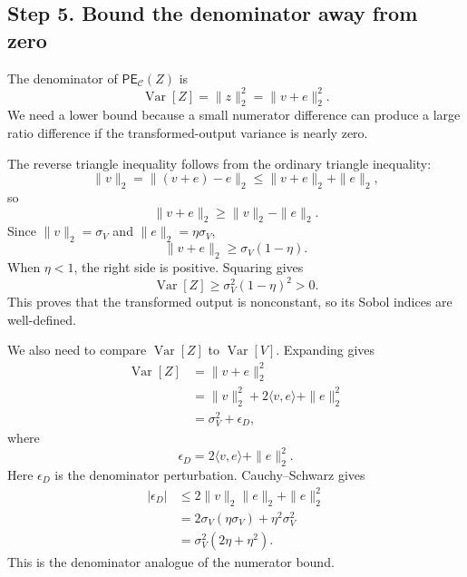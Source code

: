 \documentclass[11pt,letterpaper]{article}
\DeclareMathOperator{\Var}{Var}
\theoremstyle{remark}
\begin{document}
\subsection*{Step 5. Bound the denominator away from zero}

The denominator of $\mathsf{PE}_{\mathscr C}(Z)$ is
\begin{equation}
  \Var[Z]=\|z\|_2^2=\|v+e\|_2^2.
\end{equation}
We need a lower bound because a small numerator difference can produce a large
ratio difference if the transformed-output variance is nearly zero.

The reverse triangle inequality follows from the ordinary triangle inequality:
\begin{equation}
  \|v\|_2=\|(v+e)-e\|_2\leq\|v+e\|_2+\|e\|_2,
\end{equation}
so
\begin{equation}
  \|v+e\|_2\geq\|v\|_2-\|e\|_2.
\end{equation}
Since $\|v\|_2=\sigma_V$ and $\|e\|_2=\eta\sigma_V$,
\begin{equation}
  \|v+e\|_2\geq\sigma_V(1-\eta).
\end{equation}
When $\eta<1$, the right side is positive. Squaring gives
\begin{equation}
  \Var[Z]\geq\sigma_V^2(1-\eta)^2>0.
  \label{eq:ped_general_var_lower}
\end{equation}
This proves that the transformed output is nonconstant, so its Sobol indices are
well-defined.

We also need to compare $\Var[Z]$ to $\Var[V]$. Expanding gives
\begin{align}
  \Var[Z]
  &=\|v+e\|_2^2 \\
  &=\|v\|_2^2+2\langle v,e\rangle+\|e\|_2^2 \\
  &=\sigma_V^2+\epsilon_D,
\end{align}
where
\begin{equation}
  \epsilon_D=2\langle v,e\rangle+\|e\|_2^2.
\end{equation}
Here $\epsilon_D$ is the denominator perturbation. Cauchy--Schwarz gives
\begin{align}
  |\epsilon_D|
  &\leq 2\|v\|_2\|e\|_2+
       \|e\|_2^2 \\
  &=2\sigma_V(\eta\sigma_V)+\eta^2\sigma_V^2 \\
  &=\sigma_V^2(2\eta+
       \eta^2).
  \label{eq:ped_general_epsD}
\end{align}
This is the denominator analogue of the numerator bound.
\end{document}
